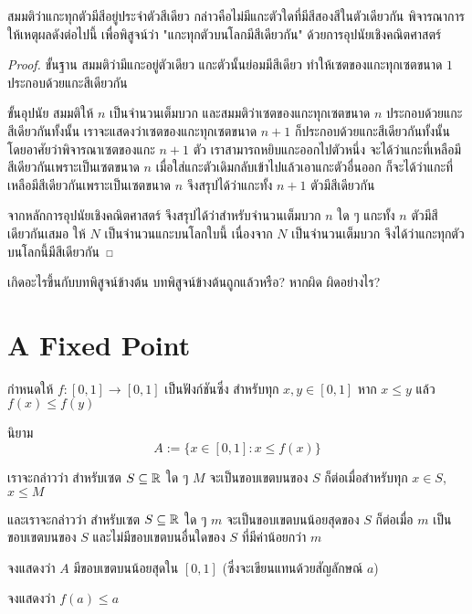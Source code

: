 \begin{exercise}
สมมติว่าแกะทุกตัวมีสีอยู่ประจำตัวสีเดียว กล่าวคือไม่มีแกะตัวใดที่มีสีสองสีในตัวเดียวกัน พิจารณาการให้เหตุผลดังต่อไปนี้ เพื่อพิสูจน์ว่า "แกะทุกตัวบนโลกมีสีเดียวกัน" ด้วยการอุปนัยเชิงคณิตศาสตร์

\begin{proof}
ขั้นฐาน สมมติว่ามีแกะอยู่ตัวเดียว แกะตัวนั้นย่อมมีสีเดียว ทำให้เซตของแกะทุกเซตขนาด $1$ ประกอบด้วยแกะสีเดียวกัน

ขั้นอุปนัย สมมติให้ $n$ เป็นจำนวนเต็มบวก และสมมติว่าเซตของแกะทุกเซตขนาด $n$ ประกอบด้วยแกะสีเดียวกันทั้งนั้น เราจะแสดงว่าเซตของแกะทุกเซตขนาด $n+1$ ก็ประกอบด้วยแกะสีเดียวกันทั้งนั้น โดยอาศัยว่าพิจารณาเซตของแกะ $n+1$ ตัว เราสามารถหยิบแกะออกไปตัวหนึ่ง จะได้ว่าแกะที่เหลือมีสีเดียวกันเพราะเป็นเซตขนาด $n$ เมื่อใส่แกะตัวเดิมกลับเข้าไปแล้วเอาแกะตัวอื่นออก ก็จะได้ว่าแกะที่เหลือมีสีเดียวกันเพราะเป็นเซตขนาด $n$ จึงสรุปได้ว่าแกะทั้ง $n+1$ ตัวมีสีเดียวกัน

จากหลักการอุปนัยเชิงคณิตศาสตร์ จึงสรุปได้ว่าสำหรับจำนวนเต็มบวก $n$ ใด ๆ แกะทั้ง $n$ ตัวมีสีเดียวกันเสมอ ให้ $N$ เป็นจำนวนแกะบนโลกใบนี้ เนื่องจาก $N$ เป็นจำนวนเต็มบวก จึงได้ว่าแกะทุกตัวบนโลกนี้มีสีเดียวกัน
\end{proof}

เกิดอะไรขึ้นกับบทพิสูจน์ข้างต้น บทพิสูจน์ข้างต้นถูกแล้วหรือ? หากผิด ผิดอย่างไร?
\end{exercise}

\section{A Fixed Point}

กำหนดให้ $f \colon [0, 1] \to [0, 1]$ เป็นฟังก์ชันซึ่ง สำหรับทุก $x, y \in [0, 1]$ หาก $x \leq y$ แล้ว $f(x) \leq f(y)$

นิยาม
\[
A := \{ x \in [0, 1] \colon x \leq f(x) \}
\]

เราจะกล่าวว่า สำหรับเซต $S \subseteq \mathbb{R}$ ใด ๆ $M$ จะเป็นขอบเขตบนของ $S$ ก็ต่อเมื่อสำหรับทุก $x \in S$, $x \leq M$

และเราจะกล่าวว่า สำหรับเซต $S \subseteq \mathbb{R}$ ใด ๆ $m$ จะเป็นขอบเขตบนน้อยสุดของ $S$ ก็ต่อเมื่อ $m$ เป็นขอบเขตบนของ $S$ และไม่มีขอบเขตบนอื่นใดของ $S$ ที่มีค่าน้อยกว่า $m$

\begin{exercise}
จงแสดงว่า $A$ มีขอบเขตบนน้อยสุดใน $[0, 1]$ (ซึ่งจะเขียนแทนด้วยสัญลักษณ์ $a$)
\end{exercise}

\begin{exercise}
จงแสดงว่า $f(a) \leq a$
\end{exercise}

